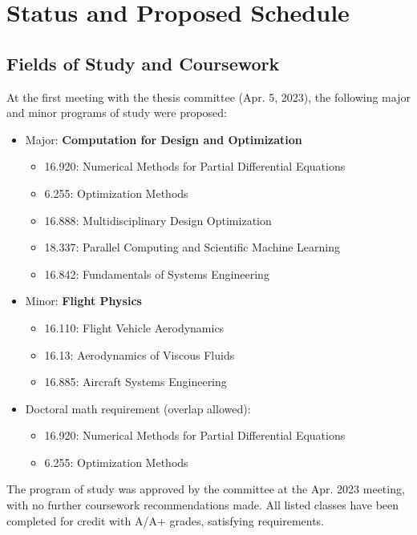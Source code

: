 \documentclass[12pt,vi,twoside]{article}
\begin{document}
    \section{Status and Proposed Schedule}

    \subsection{Fields of Study and Coursework}

    At the first meeting with the thesis committee (Apr. 5, 2023), the following major and minor programs of study were proposed:

    \begin{itemize}[noitemsep]
        \item Major: \textbf{Computation for Design and Optimization}
        \begin{itemize}[noitemsep]
            \item 16.920: Numerical Methods for Partial Differential Equations
            \item 6.255: Optimization Methods
            \item 16.888: Multidisciplinary Design Optimization
            \item 18.337: Parallel Computing and Scientific Machine Learning
            \item 16.842: Fundamentals of Systems Engineering
        \end{itemize}
        \item Minor: \textbf{Flight Physics}
        \begin{itemize}[noitemsep]
            \item 16.110: Flight Vehicle Aerodynamics
            \item 16.13: Aerodynamics of Viscous Fluids
            \item 16.885: Aircraft Systems Engineering
        \end{itemize}
        \item Doctoral math requirement (overlap allowed):
        \begin{itemize}[noitemsep]
            \item 16.920: Numerical Methods for Partial Differential Equations
            \item 6.255: Optimization Methods
        \end{itemize}
    \end{itemize}

    \noindent The program of study was approved by the committee at the Apr. 2023 meeting, with no further coursework recommendations made. All listed classes have been completed for credit with A/A+ grades, satisfying requirements.
\end{document}
